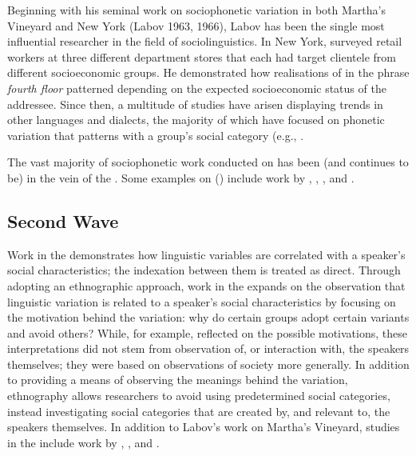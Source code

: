 Beginning with his seminal work on sociophonetic variation in both Martha's Vineyard and New York (Labov 1963, 1966), Labov has been the single most influential researcher in the field of sociolinguistics. In New York, \citet{labov1966} surveyed retail workers at three different department stores that each had target clientele from different socioeconomic groups. He demonstrated how realisations of  in the phrase \textit{fourth floor} patterned depending on the expected socioeconomic status of the addressee. Since then, a multitude of studies have arisen displaying trends in other languages and dialects, the majority of which have focused on phonetic variation that patterns with a group's social category (e.g., \cite{trudgill1972,romaine1978,wolfram1974}. 

The vast majority of sociophonetic work conducted on  has been (and continues to be) in the vein of the . Some examples on  () include work by \citet{maclagangordonlewis1999}, \citet{haymaclagan2010}, \citet{dalywarren2001}, and \citet{starksreffell2006}.


\subsection{Second Wave}\label{sec:secondwave}
Work in the  demonstrates how linguistic variables are correlated with a speaker's social characteristics; the indexation between them is treated as direct. Through adopting an ethnographic approach, work in the  expands on the observation that linguistic variation is related to a speaker's social characteristics by focusing on the motivation behind the variation: why do certain groups adopt certain variants and avoid others? While, for example, \citet{trudgill1972} reflected on the possible motivations, these interpretations did not stem from observation of, or interaction with, the speakers themselves; they were based on observations of society more generally. In addition to providing a means of observing the meanings behind the variation, ethnography allows researchers to avoid using predetermined social categories, instead investigating social categories that are created by, and relevant to, the speakers themselves. In addition to Labov's work on Martha's Vineyard, studies in the  include work by \citet{holmquist1985}, \citet{eckert2000}, and \citet{milroymilroy1978}.  

